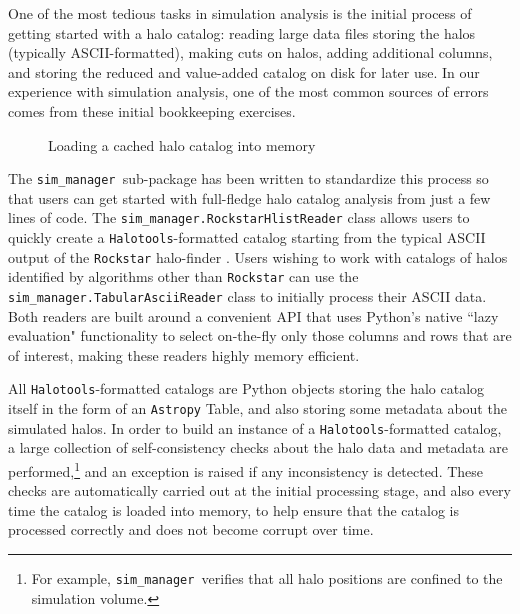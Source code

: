 \documentclass[twocolumn, tighten]{aastex6}
\newcommand{\sims}{{\tt sim\_manager }}
\begin{document}
One of the most tedious tasks in simulation analysis is the initial process of getting started with a halo catalog: reading large data files storing the halos (typically ASCII-formatted), making cuts on halos, adding additional columns, and storing the reduced and value-added catalog on disk for later use. In our experience with simulation analysis, one of the most common sources of errors comes from these initial bookkeeping exercises.

\begin{figure}
\center
\caption{Loading a cached halo catalog into memory\label{code:cachedsim}}
\vspace{0.1in}
\end{figure}

The \sims sub-package has been written to standardize this process so that users can get started with full-fledge halo catalog analysis from just a few lines of code. The {\tt sim\_manager.RockstarHlistReader} class allows users to quickly create a {\tt Halotools}-formatted catalog starting from the typical ASCII output of the {\tt Rockstar} halo-finder \citep{behroozi_rockstar11, rockstar_trees}. Users wishing to work with catalogs of halos identified by algorithms other than {\tt Rockstar} can use the {\tt sim\_manager.TabularAsciiReader} class to initially process their ASCII data. Both readers are built around a convenient API that uses Python's native ``lazy evaluation" functionality to select on-the-fly only those columns and rows that are of interest, making these readers highly memory efficient.

All {\tt Halotools}-formatted catalogs are Python objects storing the halo catalog itself in the form of an {\tt Astropy} Table, and also storing some metadata about the simulated halos. In order to build an instance of a {\tt Halotools}-formatted catalog, a large collection of self-consistency checks about the halo data and metadata are performed,\footnote{For example, \sims verifies that all halo positions are confined to the simulation volume.} and an exception is raised if any inconsistency is detected. These checks are automatically carried out at the initial processing stage, and also every time the catalog is loaded into memory, to help ensure that the catalog is processed correctly and does not become corrupt over time.
\end{document}
